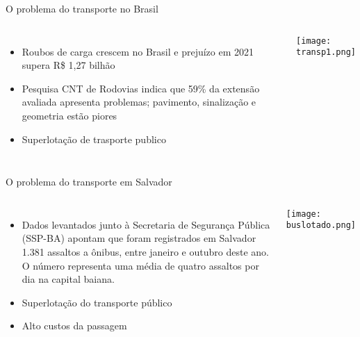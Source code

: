 \begin{frame}[t]{O problema do transporte no Brasil}
    \vspace{0.5cm}
    \begin{columns}
            \begin{itemize}
                \item Roubos de carga crescem no Brasil e prejuízo em 2021 supera R\$ 1,27 bilhão \cite{Roubosdecarga:online}
                \item Pesquisa CNT de Rodovias indica que 59\% da extensão avaliada apresenta problemas; pavimento, sinalização e geometria estão piores \cite{Pioraest:online}
                \item Superlotação de trasporte publico \cite{Superlot45:online}
            \end{itemize}
            \texttt{[image: transp1.png]}
    \end{columns}
    \vspace{1cm}
\end{frame}

\begin{frame}[t]{O problema do transporte em Salvador}
    \vspace{0.5cm}
    \begin{columns}
            \begin{itemize}
                \item Dados levantados junto à Secretaria de Segurança Pública (SSP-BA) apontam que foram registrados em Salvador 1.381 assaltos a ônibus, entre janeiro e outubro deste ano. O número representa uma média de quatro assaltos por dia na capital baiana. \cite{assaltossa:online}
                \item Superlotação do transporte público \cite{Passagei20:online}
                \item Alto custos da passagem
            \end{itemize}
            \texttt{[image: buslotado.png]}
    \end{columns}
    \vspace{1cm}
\end{frame}
